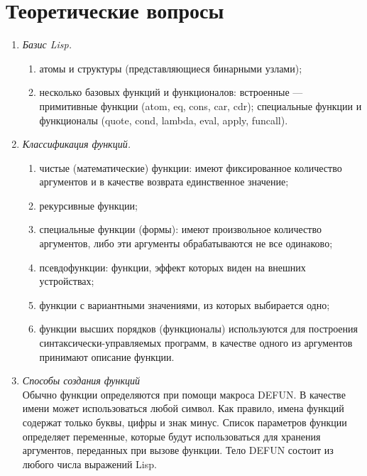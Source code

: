 \chapter{Теоретические вопросы}

\begin{enumerate}[wide=0pt]
\item \textit{Базис Lisp.} \\
\begin{enumerate}
	\item атомы и структуры (представляющиеся бинарными узлами);
	\item несколько базовых функций и функционалов: встроенные --- примитивные функции (atom, eq, cons, car, cdr); специальные функции и функционалы (quote, cond, lambda, eval, apply, funcall).
\end{enumerate}
\item \textit{Классификация функций.} \\
\begin{enumerate}
	\item чистые (математические) функции: имеют фиксированное количество
	аргументов и в качестве возврата единственное значение;
	\item рекурсивные функции;
	\item специальные функции (формы): имеют произвольное количество
	аргументов, либо эти аргументы обрабатываются не все одинаково;
	\item псевдофункции: функции, эффект которых виден на внешних
	устройствах;
	\item функции с вариантными значениями, из которых выбирается одно;
	\item функции высших порядков (функционалы) используются для
	построения синтаксически-управляемых программ, в качестве одного
	из аргументов принимают описание функции.
\end{enumerate}
\item \textit{Способы создания функций} \\
Обычно функции определяются при помощи макроса DEFUN. В качестве имени может использоваться любой символ. Как правило, имена функций содержат только буквы, цифры и знак минус. Список параметров функции определяет переменные, которые будут использоваться для хранения аргументов, переданных при вызове функции. Тело DEFUN состоит из любого числа выражений Lisp. 


\end{enumerate}
